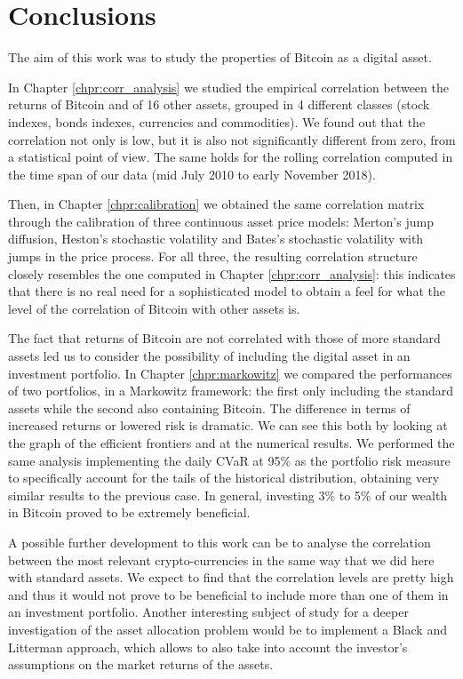 \chapter{Conclusions}
\label{chpr:conclusion}


The aim of this work was to study the properties of Bitcoin as a digital asset.

In Chapter \ref{chpr:corr_analysis} we studied the empirical correlation between the returns of Bitcoin and of 16 other assets, grouped in 4 different classes (stock indexes, bonds indexes, currencies and commodities). We found out that the correlation not only is low, but it is also not significantly different from zero, from a statistical point of view. The same holds for the rolling correlation computed in the time span of our data (mid July 2010 to early November 2018).

\bigskip
Then, in Chapter \ref{chpr:calibration} we obtained the same correlation matrix through the calibration of three continuous asset price models: Merton's jump diffusion, Heston's stochastic volatility and Bates's stochastic volatility with jumps in the price process.
For all three, the resulting correlation structure closely resembles the one computed in Chapter \ref{chpr:corr_analysis}: this indicates that there is no real need for a sophisticated model to obtain a feel for what the level of the correlation of Bitcoin with other assets is.

\bigskip
The fact that returns of Bitcoin are not correlated with those of more standard assets led us to consider the possibility of including the digital asset in an investment portfolio.
In Chapter \ref{chpr:markowitz} we compared the performances of two portfolios, in a Markowitz framework: the first only including the standard assets while the second also containing Bitcoin. The difference in terms of increased returns or lowered risk is dramatic. We can see this both by looking at the graph of the efficient frontiers and at the numerical results.
We performed the same analysis implementing the daily CVaR at 95\% as the portfolio risk measure to specifically account for the tails of the historical distribution, obtaining very similar results to the previous case.
In general, investing 3\% to 5\% of our wealth in Bitcoin proved to be extremely beneficial.

\bigskip

A possible further development to this work can be to analyse the correlation between the most relevant crypto-currencies in the same way that we did here with standard assets. We expect to find that the correlation levels are pretty high and thus it would not prove to be beneficial to include more than one of them in an investment portfolio. 
\noindent
Another interesting subject of study for a deeper investigation of the asset allocation problem would be to implement a Black and Litterman approach, which allows to also take into account the investor's assumptions on the market returns of the assets.


